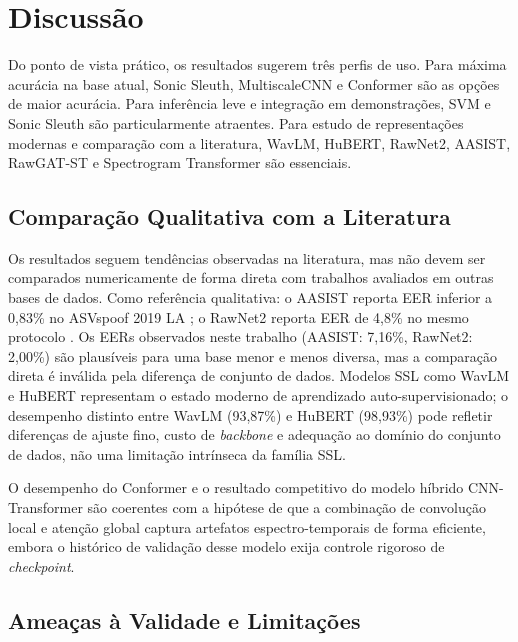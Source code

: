 \documentclass[12pt,a4paper]{article}
\begin{document}
\section{Discussão}
\label{sec:discussao}

Do ponto de vista prático, os resultados sugerem três perfis de uso. Para
máxima acurácia na base atual, Sonic Sleuth, MultiscaleCNN e Conformer são as
opções de maior acurácia. Para inferência leve e integração em demonstrações, SVM e
Sonic Sleuth são particularmente atraentes. Para estudo de representações
modernas e comparação com a literatura, WavLM, HuBERT, RawNet2, AASIST,
RawGAT-ST e Spectrogram Transformer são essenciais.

\subsection{Comparação Qualitativa com a Literatura}

Os resultados seguem tendências observadas na literatura, mas não devem ser
comparados numericamente de forma direta com trabalhos avaliados em outras
bases de dados. Como referência qualitativa: o AASIST reporta EER inferior
a 0,83\% no ASVspoof 2019 LA \cite{jung2022aasist}; o RawNet2 reporta EER de
4,8\% no mesmo protocolo \cite{tak2021rawnet2}. Os EERs observados neste
trabalho (AASIST: 7,16\%, RawNet2: 2,00\%) são plausíveis para uma base
menor e menos diversa, mas a comparação direta é inválida pela diferença de
conjunto de dados. Modelos SSL como WavLM e HuBERT representam o estado moderno
de aprendizado auto-supervisionado; o desempenho distinto entre WavLM (93,87\%)
e HuBERT (98,93\%) pode refletir diferenças de ajuste fino, custo de
\textit{backbone} e adequação ao domínio do conjunto de dados, não uma
limitação intrínseca da família SSL.

O desempenho do Conformer e o resultado competitivo do modelo híbrido
CNN-Transformer são coerentes com a hipótese de que a combinação de convolução
local e atenção global captura artefatos espectro-temporais de forma eficiente,
embora o histórico de validação desse modelo exija controle rigoroso de
\textit{checkpoint}.

\subsection{Ameaças à Validade e Limitações}
\label{sec:ameacas_validade}
\end{document}
